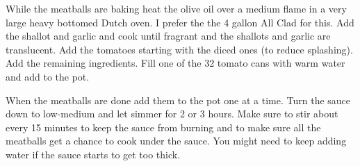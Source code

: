 \begin{IngredientsAndSteps}
    {
        While the meatballs are baking heat the olive oil over a medium flame in a very large heavy bottomed Dutch oven.
        I prefer the the 4 gallon All Clad for this. Add the shallot and garlic and cook until fragrant and the shallots
        and garlic are translucent. Add the tomatoes starting with the diced ones (to reduce splashing). Add the remaining
        ingredients. Fill one of the 32 \Ounce tomato cans with warm water and add to the pot.
    }

    {
        When the meatballs are done add them to the pot one at a time. Turn the sauce down to low-medium and let simmer
        for 2 or 3 hours. Make sure to stir about every 15 minutes to keep the sauce from burning and to make sure all the
        meatballs get a chance to cook under the sauce. You might need to keep adding water if the sauce starts to get too
        thick.
    }

\end{IngredientsAndSteps}

%
%
%
%
\newpage



